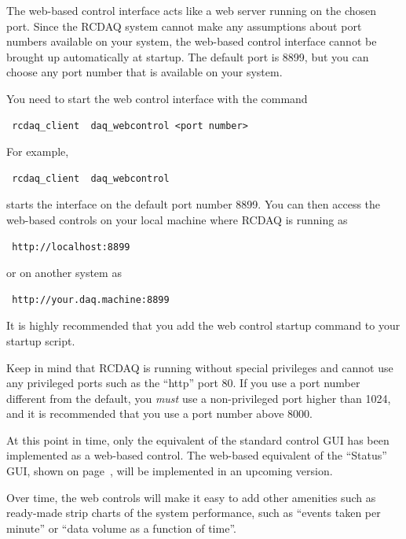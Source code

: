 \documentclass{article}[11pt]
\begin{document}
The web-based control interface acts like a web server running on the
chosen port. Since the RCDAQ system cannot make any assumptions about
port numbers available on your system, the web-based control interface
cannot be brought up automatically at startup. The default port is
8899, but you can choose any port number that is available on your
system.

You need to start the web control interface with the command
\begin{verbatim}
 rcdaq_client  daq_webcontrol <port number> 
\end{verbatim}

For example,
\begin{verbatim}
 rcdaq_client  daq_webcontrol
\end{verbatim}
starts the interface on the default port number 8899. You can then access the
web-based controls on your local machine where RCDAQ is running as
\begin{verbatim}
 http://localhost:8899
\end{verbatim}
or on another system as
\begin{verbatim}
 http://your.daq.machine:8899
\end{verbatim}

It is highly recommended that you add the web control startup command 
to your startup script.  

\vskip 3mm
\begin{minipage}[c]{0.1\linewidth}
{\Huge{}}
\end{minipage}
\begin{minipage}[c]{0.9\linewidth}
Keep in mind that RCDAQ is running without special privileges and
cannot use any privileged ports such as the ``http'' port 80. If you
use a port number different from the default, you \emph{must} use a
non-privileged port higher than 1024, and it is recommended that you
use a port number above 8000.
\end{minipage}
\vskip 3mm

At this point in time, only the equivalent of the standard control GUI
has been implemented as a web-based control. The web-based equivalent
of the ``Status'' GUI, shown on page~\pageref{rcdaqstatus}, will be
implemented in an upcoming version.

Over time, the web controls will make it easy to add other amenities
such as ready-made strip charts of the system performance, such as
``events taken per minute'' or ``data volume as a function of time''.
\end{document}
